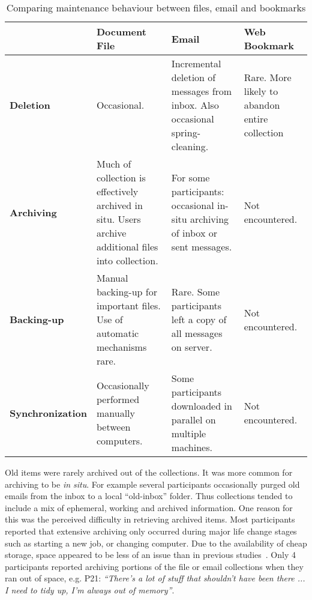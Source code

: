 \begin{table}[hbtp]
\begin{center}
\begin{footnotesize}
\setlength{\extrarowheight}{2pt}
\begin{tabular}{|p{2.5cm}|p{3.5cm}|p{3.5cm}|p{3.5cm}|}
\hline
    {\bf } & {\bf Document File} & {\bf Email} & {\bf Web Bookmark} \\
\hline
{\bf Deletion} & Occasional. & Incremental deletion of messages from inbox. Also occasional spring-cleaning. & Rare. More likely to abandon entire collection \\
\hline
{\bf Archiving} & Much of collection is effectively archived in situ. Users archive additional files into collection. & For some participants: occasional in-situ archiving of inbox or sent messages. & Not encountered. \\
\hline
{\bf Backing-up} & Manual backing-up for important files. Use of automatic mechanisms rare. & Rare. Some participants left a copy of all messages on server. & Not encountered. \\
\hline
{\bf Synchronization} & Occasionally performed manually between computers. & Some participants downloaded in parallel on multiple machines. & Not encountered. \\
\hline
\end{tabular}  
\end{footnotesize}
\caption{Comparing maintenance behaviour between files, email and bookmarks}
\label{table:chapter3_maintenance_strategy}
\end{center}
\end{table}


Old items were rarely archived out of the collections. It was more common for archiving to be \textit{in situ}.  For example several participants occasionally purged old emails from the inbox to a local ``old-inbox'' folder.  Thus collections tended to include a mix of ephemeral, working and archived information.  One reason for this was the perceived difficulty in retrieving archived items. Most participants reported that extensive archiving only occurred during major life change stages such as starting a new job, or changing computer.  Due to the availability of cheap storage, space appeared to be less of an issue than in previous studies~\citep{barreau:95}.  Only 4 participants reported archiving portions of the file or email collections when they ran out of space, e.g. P21: \textit{``There's a lot of stuff that shouldn't have been there ... I need to tidy up, I'm always out of memory''}.

